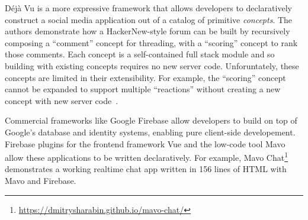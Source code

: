 

Déjà Vu is a more expressive framework that allows developers
to declaratively construct a social media application out
of a catalog of primitive \emph{concepts}.
The authors demonstrate how a HackerNew-style forum can be built by
recursively composing a ``comment'' concept for threading,
with a ``scoring'' concept to rank those comments.
Each concept is a self-contained full stack module
and so building with existing concepts requires no new server code.
Unforuntately, these concepts are limited in their extensibility.
For example, the ``scoring'' concept cannot be expanded
to support multiple ``reactions''
without creating a new concept with new server code~\cite{dejavu}.

Commercial frameworks like Google Firebase allow developers
to build on top of Google's database and identity systems,
enabling pure client-side developement.
Firebase plugins for the frontend framework Vue and the low-code tool
Mavo~\cite{mavo} allow these applications to be written declaratively.
For example, Mavo Chat\footnote{
    \url{https://dmitrysharabin.github.io/mavo-chat/}
} demonstrates a working realtime chat app written in 156 lines of HTML
with Mavo and Firebase.


